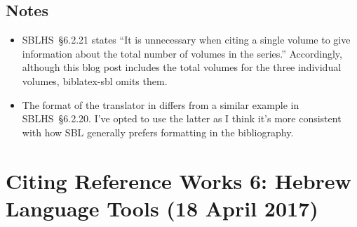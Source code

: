 \documentclass[a4paper]{article}
\newcommand*{\pkg}[1]{\textsf{#1}}
\begin{document}
\subsection{Notes}

\begin{itemize}
  \item SBLHS~§6.2.21 states “It is unnecessary when citing a single volume to
    give information about the total number of volumes in the series.”
    Accordingly, although this blog post includes the total volumes for the
    three individual  volumes,
    \pkg{biblatex-sbl} omits them.
  \item The format of the translator in  differs
    from a similar example in SBLHS~§6.2.20. I've opted to use the latter as I
    think it's more consistent with how SBL generally prefers formatting in
    the bibliography.
\end{itemize}


\section{Citing Reference Works 6: Hebrew Language Tools (18 April 2017)}
\end{document}
